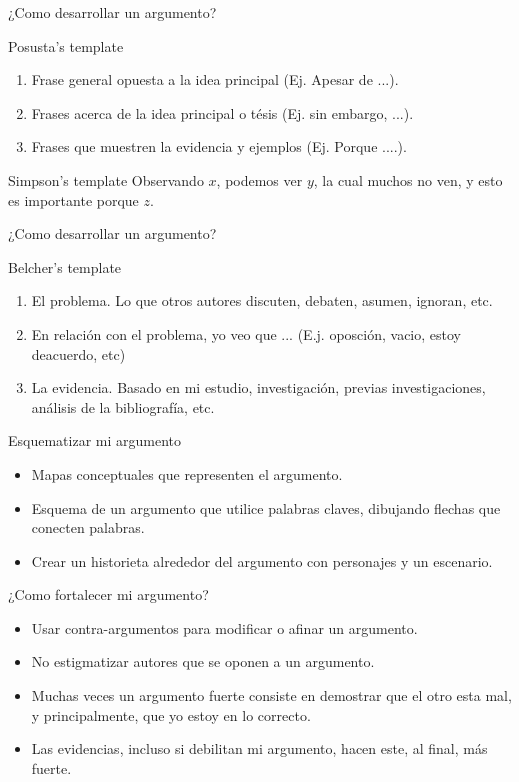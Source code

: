 \documentclass [xcolor=svgnames, t] {beamer}
\begin{document}
\begin{frame}{¿Como desarrollar un argumento?}
\begin{exampleblock}{Posusta's template}
\begin{enumerate}
\item Frase general opuesta a la idea principal (Ej. Apesar de ...).
\item Frases acerca de la idea principal o t\'esis (Ej. sin embargo, ...).
\item Frases que muestren la evidencia y ejemplos (Ej. Porque ....).
\end{enumerate}
\end{exampleblock}
\begin{exampleblock}{Simpson's template}
Observando $x$, podemos ver $y$, la cual muchos no ven, y esto es importante porque $z$.
\end{exampleblock}
\end{frame}

\begin{frame}{¿Como desarrollar un argumento?}
\begin{exampleblock}{Belcher's template}
\begin{enumerate}
\item El problema. Lo que otros autores discuten, debaten, asumen, ignoran, etc.
\item En relaci\'on con el problema, yo veo que ... (E.j. oposci\'on, vacio, estoy deacuerdo, etc)
\item La evidencia. Basado en mi estudio, investigaci\'on, previas investigaciones, an\'alisis de la bibliograf\'ia, etc.
\end{enumerate}
\end{exampleblock}
\end{frame}

\begin{frame}{Esquematizar mi argumento}
\begin{itemize}
\item Mapas conceptuales que representen el argumento.
\item Esquema de un argumento que utilice palabras claves, dibujando flechas que conecten palabras.
\item Crear un historieta alrededor del argumento con personajes y un escenario.
\end{itemize}
\end{frame}

\begin{frame}{¿Como fortalecer mi argumento?}
\begin{itemize}
\item Usar contra-argumentos para modificar o afinar un argumento.
\item No estigmatizar autores que se oponen a un argumento.
\item Muchas veces un argumento fuerte consiste en demostrar que el otro esta mal, y principalmente, que yo estoy en lo correcto. 
\item Las evidencias, incluso si debilitan mi argumento, hacen este, al final, m\'as fuerte.
\end{itemize}
\end{frame}
\end{document}
